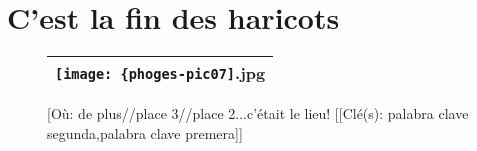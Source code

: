 \documentclass[12pt,twocolumn,french]{article}
\begin{document}
\section{C'est la fin des haricots}
%

  \begin{figure}[H]
    \caption{
       [Où: de plus//place 3//place 2...c'était le lieu!
      [[Clé(s): palabra clave segunda,palabra clave premera]] 
    }
    \vspace{4mm}
    \label{phoges-pic07.jpg}
    \noindent \centering{}
    \begin{tabular}{|c|}
      \hline
          \texttt{[image: \{phoges-pic07]}.jpg}
        \tabularnewline \hline
    \end{tabular}
  \end{figure}
%
\end{document}

